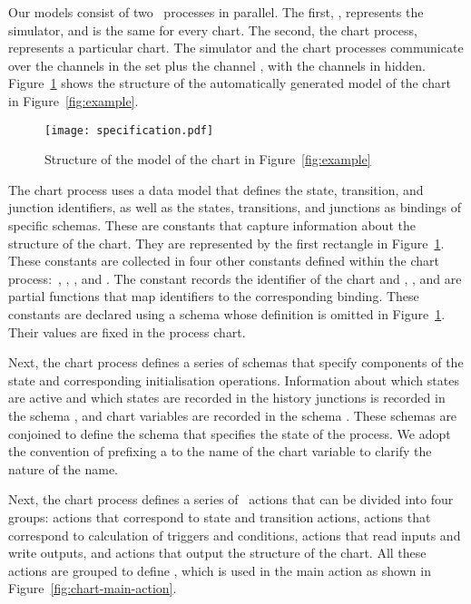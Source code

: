 \documentclass[submission]{eptcs}
\begin{document}
Our models consist of two \Circus~processes in parallel. The
first, , represents the simulator, and is the same for every chart.
The second, the chart process, represents a particular chart.
The simulator and the chart processes communicate over the channels in the set  plus
the channel , with the channels in  hidden.
Figure~\ref{fig:model} shows the structure of the automatically
generated model of the chart in Figure~\ref{fig:example}.

\begin{figure}[t]
\centering
\texttt{[image: specification.pdf]}
\caption{Structure of the model of the chart in Figure~\ref{fig:example}}
\label{fig:model}
\end{figure}



The chart process  uses a data model that defines the state, transition, and junction identifiers, as well as the states, transitions, and junctions as bindings of specific schemas. These are constants that capture information about the structure of the chart. They are represented by the first rectangle in Figure~\ref{fig:model}.
These constants are collected in four other constants defined within the chart process:~, , , and . The constant  records the identifier of the chart and , , and  are partial functions that map identifiers to the corresponding binding. These constants are declared using a schema  whose definition is omitted in Figure~\ref{fig:model}. Their values are fixed in the process chart.

Next, the chart process defines a series of schemas that specify components of the state and corresponding initialisation operations. Information about which states are active and which states are recorded in the history junctions is recorded in the schema , and chart variables are recorded in the schema . These schemas are conjoined to define the schema  that specifies the state of the process. We adopt the convention of prefixing a  to the name of the chart variable to clarify the nature of the name.

Next, the chart process defines a series of \Circus~actions that can be divided into four groups: actions that correspond to state and transition actions, actions that correspond to calculation of triggers and conditions, actions that read inputs and write outputs, and actions that output the structure of the chart.
All these actions are grouped to define , which is used in the main action as shown in Figure~\ref{fig:chart-main-action}.
\end{document}
